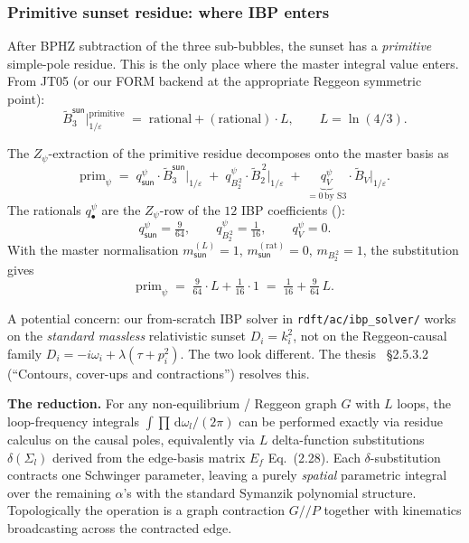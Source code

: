 \documentclass[11pt,a4paper]{article}
\renewcommand{\dd}[1]{\,\mathrm{d}#1}
\theoremstyle{definition}
\theoremstyle{plain}
\begin{document}
\subsubsection{Primitive sunset residue: where IBP enters}
\label{app:where-ibp-enters}

\begin{stdbox}
After BPHZ subtraction of the three sub-bubbles, the sunset has a
\emph{primitive} simple-pole residue.  This is the only place where
the master integral value enters.  From JT05 (or our FORM backend at
the appropriate Reggeon symmetric point):
\[
  \tilde B_3^{\textsf{sun}}\big|_{1/\varepsilon}^{\text{primitive}}
  \;=\; \text{rational} + (\text{rational})\cdot L,
  \qquad L = \ln(4/3).
\]
\end{stdbox}

\begin{cfacbox}
The $Z_\psi$-extraction of the primitive residue decomposes onto the
master basis as
\begin{equation}\label{eq:zpsi-prim-walk}
  \mathrm{prim}_\psi
  \;=\;
  q^\psi_{\textsf{sun}} \cdot \tilde B_3^{\textsf{sun}}\big|_{1/\varepsilon}
  \;+\;
  q^\psi_{B_2^{\,2}} \cdot \tilde B_2^{\,2}\big|_{1/\varepsilon}
  \;+\;
  \underbrace{q^\psi_V}_{= 0\,\text{by S3}} \cdot \tilde B_V\big|_{1/\varepsilon}.
\end{equation}
The rationals $q^\psi_\bullet$ are the $Z_\psi$-row of the $12$ IBP
coefficients ():
\[
  q^\psi_{\textsf{sun}} = \tfrac{9}{64},\qquad
  q^\psi_{B_2^{\,2}} = \tfrac{1}{16},\qquad
  q^\psi_V = 0.
\]
With the master normalisation $m_{\textsf{sun}}^{(L)} = 1$,
$m_{\textsf{sun}}^{(\text{rat})} = 0$, $m_{B_2^{\,2}} = 1$, the
substitution gives
\[
  \mathrm{prim}_\psi
  \;=\; \tfrac{9}{64}\cdot L + \tfrac{1}{16}\cdot 1
  \;=\; \tfrac{1}{16} + \tfrac{9}{64}\,L.
\]
\end{cfacbox}

\begin{cfacbox}
A potential concern: our from-scratch IBP solver in
\texttt{rdft/ac/ibp\_solver/} works on the \emph{standard massless}
relativistic sunset $D_i = k_i^2$, not on the Reggeon-causal family
$D_i = -i\omega_i + \lambda(\tau + p_i^2)$.  The two look different.
The thesis~\cite{amarteifio2019} \S 2.5.3.2 (``Contours, cover-ups
and contractions'') resolves this.

\textbf{The reduction.}  For any non-equilibrium / Reggeon graph $G$
with $L$ loops, the loop-frequency integrals
$\int\!\prod \dd\omega_l/(2\pi)$ can be performed exactly via residue
calculus on the causal poles, equivalently via $L$ delta-function
substitutions $\delta(\Sigma_l)$ derived from the edge-basis matrix
$E_f$ \cite{amarteifio2019} Eq.~(2.28).  Each $\delta$-substitution
contracts one Schwinger parameter, leaving a purely \emph{spatial}
parametric integral over the remaining $\alpha$'s with the standard
Symanzik polynomial structure.  Topologically the operation is a
graph contraction $G //\!P$ together with kinematics broadcasting
across the contracted edge.
\end{cfacbox}
\end{document}
